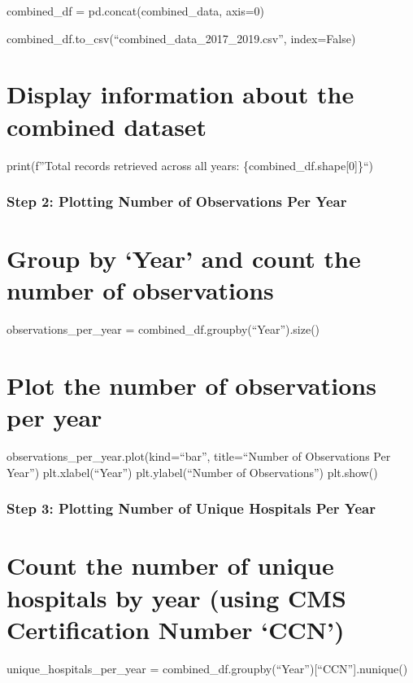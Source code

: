 \documentclass[
  letterpaper,
  DIV=11,
  numbers=noendperiod]{scrartcl}
\begin{document}
combined\_df = pd.concat(combined\_data, axis=0)

combined\_df.to\_csv(``combined\_data\_2017\_2019.csv'', index=False)

\section{Display information about the combined
dataset}\label{display-information-about-the-combined-dataset}

print(f''Total records retrieved across all years:
\{combined\_df.shape{[}0{]}\}``)

\subsubsection{Step 2: Plotting Number of Observations Per
Year}\label{step-2-plotting-number-of-observations-per-year}

\section{Group by `Year' and count the number of
observations}\label{group-by-year-and-count-the-number-of-observations}

observations\_per\_year = combined\_df.groupby(``Year'').size()

\section{Plot the number of observations per
year}\label{plot-the-number-of-observations-per-year}

observations\_per\_year.plot(kind=``bar'', title=``Number of
Observations Per Year'') plt.xlabel(``Year'') plt.ylabel(``Number of
Observations'') plt.show()

\subsubsection{Step 3: Plotting Number of Unique Hospitals Per
Year}\label{step-3-plotting-number-of-unique-hospitals-per-year}

\section{Count the number of unique hospitals by year (using CMS
Certification Number
`CCN')}\label{count-the-number-of-unique-hospitals-by-year-using-cms-certification-number-ccn}

unique\_hospitals\_per\_year =
combined\_df.groupby(``Year''){[}``CCN''{]}.nunique()
\end{document}
